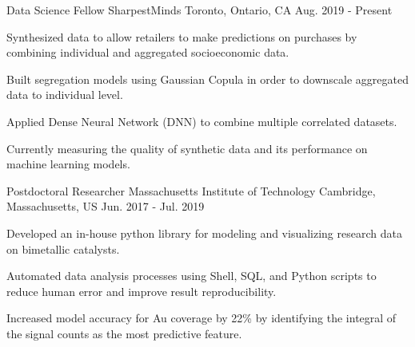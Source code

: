 


\begin{cventries}


\cventry
{Data Science Fellow}
{SharpestMinds}
{Toronto, Ontario, CA}
{Aug. 2019 - Present}
{
\begin{cvitems}
\item {Synthesized data to allow retailers to make predictions on
    purchases by combining individual and aggregated socioeconomic data.}
\item {Built segregation models using Gaussian Copula in order to downscale
    aggregated data to individual level.}
\item {Applied Dense Neural Network (DNN) to combine multiple correlated
    datasets.}
\item {Currently measuring the quality of synthetic data and its performance on
    machine learning models.}
\end{cvitems}
}

\cventry
{Postdoctoral Researcher}
{Massachusetts Institute of Technology}
{Cambridge, Massachusetts, US}
{Jun. 2017 - Jul. 2019}
{
\begin{cvitems}
\item {Developed an in-house python library for modeling and visualizing
    research data on bimetallic catalysts.}
\item {Automated data analysis processes using Shell, SQL, and Python scripts to
    reduce human error and improve result reproducibility.}
\item {Increased model accuracy for Au coverage by 22\% by identifying the
    integral of the signal counts as the most predictive feature.}
\end{cvitems}
}


\end{cventries}
